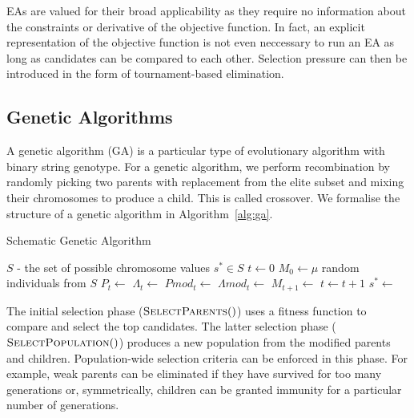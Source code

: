 EAs are valued for their broad applicability as they require no information about the constraints or derivative of the objective function. In fact, an explicit representation of the objective function is not even neccessary to run an EA as long as candidates can be compared to each other. Selection pressure can then be introduced in the form of tournament-based elimination.

\subsection{Genetic Algorithms}

A genetic algorithm (GA) is a particular type of evolutionary algorithm with binary string genotype. For a genetic algorithm, we perform recombination by randomly picking two parents with replacement from the elite subset and mixing their chromosomes to produce a child. This is called crossover. We formalise the structure of a genetic algorithm in Algorithm~\ref{alg:ga}.\\

\begin{algorithm}
  \caption{Schematic Genetic Algorithm}\label{alg:ga}
  \begin{algorithmic}
  \Require $S$ - the set of possible chromosome values
  \Ensure $s^* \in S$
  \State $t \gets 0$
  \State $M_0 \gets \mu$ random individuals from $S$
    \State {}
    \State $P_t \gets$     
    \State $\Lambda_t \gets$   
    \State $Pmod_t \gets$ 
    \State $\Lambda mod_t \gets$ 
    \State $M_{t+1} \gets$ 
    \State $t \gets t+1$
  \EndWhile
  \State $s^* \gets$ 
  \end{algorithmic}
\end{algorithm}

The initial selection phase ($\Call{SelectParents}$) uses a fitness function to compare and select the top candidates. The latter selection phase ($\Call{SelectPopulation}$) produces a new population from the modified parents and children. Population-wide selection criteria can be enforced in this phase. For example, weak parents can be eliminated if they have survived for too many generations or, symmetrically, children can be granted immunity for a particular number of generations.\\

